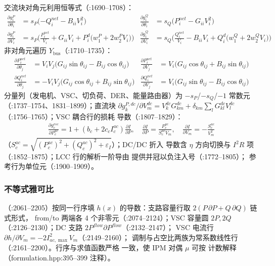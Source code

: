 交流块对角元利用恒等式（:1690--1708）：
\begin{align*}
\frac{\partial g^P_i}{\partial\theta_i}&=s_P\big({-Q^{net}_i}-B_{ii}V_i^2\big)
&\frac{\partial g^Q_i}{\partial\theta_i}&=s_Q\big(P^{net}_i-G_{ii}V_i^2\big)\\
\frac{\partial g^P_i}{\partial V_i}&=s_P\Big(\frac{P^{net}_i}{V_i}+G_{ii}V_i
 +P^d_i\big(w^{P}_1+2w^{P}_2V_i\big)\Big)
&\frac{\partial g^Q_i}{\partial V_i}&=s_Q\Big(\frac{Q^{net}_i}{V_i}-B_{ii}V_i
 +Q^d_i\big(w^{Q}_1+2w^{Q}_2V_i\big)\Big)
\end{align*}
非对角元遍历 $Y_{\mathrm{bus}}$（:1710--1735）：
\begin{align*}
\frac{\partial P^{net}_i}{\partial\theta_j}&=V_iV_j\big(G_{ij}\sin\theta_{ij}-B_{ij}\cos\theta_{ij}\big)
&\frac{\partial P^{net}_i}{\partial V_j}&=V_i\big(G_{ij}\cos\theta_{ij}+B_{ij}\sin\theta_{ij}\big)\\
\frac{\partial Q^{net}_i}{\partial\theta_j}&=-V_iV_j\big(G_{ij}\cos\theta_{ij}+B_{ij}\sin\theta_{ij}\big)
&\frac{\partial Q^{net}_i}{\partial V_j}&=V_i\big(G_{ij}\sin\theta_{ij}-B_{ij}\cos\theta_{ij}\big)
\end{align*}
分量列（发电机、VSC、切负荷、DER、能量路由器）为 $-s_P$/$-s_Q$/$-1$
常数元（:1737--1754、1831--1899）；直流块
$\partial g^{P,dc}_k/\partial V^{dc}_m=V^{dc}_kG^{dc}_{km}
+\delta_{km}\sum_lG^{dc}_{kl}V^{dc}_l$（:1756--1765）；VSC 耦合行的损耗
导数（:1807--1829）：
\begin{align*}
\frac{\partial g^{vsc}_c}{\partial P^{ac}_c}=1+(b_c+2c_cI^{ac}_c)\frac{\partial I}{\partial P},\quad
\frac{\partial I}{\partial P}=\frac{P^{ac}_c}{S^{ac}_cV_m},\quad
\frac{\partial I}{\partial V_m}=-\frac{S^{ac}_c}{V_m^2}
\end{align*}
（$S^{ac}_c=\sqrt{(P^{ac}_c)^2+(Q^{ac}_c)^2+\varepsilon_I}$）；DC/DC 折入
导数含 $\eta$ 方向切换与 $I^2R$ 项（:1852--1875）；LCC 行的解析一阶导由
 提供并冠以负注入号（:1772--1805）；
参考行为单位元（:1900--1909）。

\subsubsection*{不等式雅可比}
（:2061--2205）按同一行序填
$h(x)$ 的导数：支路容量行取 $2(P\,\partial P+Q\,\partial Q)$ 链式形式，
from/to 两端各 4 个非零元（:2074--2124）；VSC 容量圆 $2P,2Q$
（:2126--2130）；DC 支路 $2P^{flow}\partial P^{flow}$（:2132--2147）；
VSC 电流行 $\partial h/\partial V_m=-2I_{ac,\max}^2V_m$（:2149--2160）；
调制与占空比两族为常系数线性行（:2161--2200）。行序与求值函数严格
一致，使 IPM 对偶 $\mu$ 可按  计数解释
（formulation.hpp:395--399 注释）。

